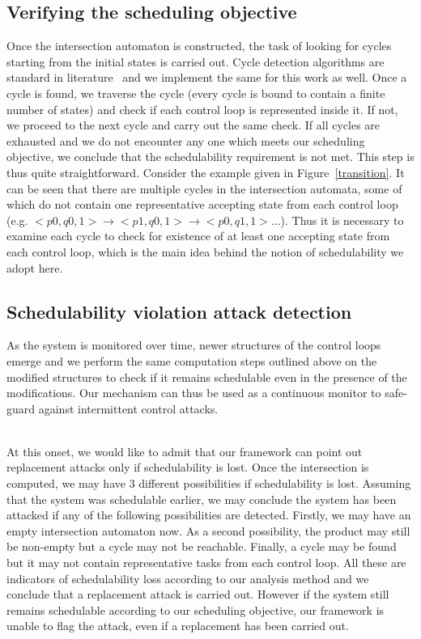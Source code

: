 \subsection{Verifying the scheduling objective}
\noindent
Once the intersection automaton is constructed, the task of looking for cycles starting from the initial states is carried out. Cycle detection algorithms are standard in literature~\cite{Clarke:2000:MC:332656} and we implement the same for this work as well. Once a cycle is found, we traverse the cycle (every cycle is bound to contain a finite number of states) and check if each control loop is represented inside it. If not, we proceed to the next cycle and carry out the same check. If all cycles are exhausted and we do not encounter any one which meets our scheduling objective, we conclude that the schedulability requirement is not met. This step is thus quite straightforward. Consider the example given in Figure~\ref{transition}. It can be seen that there are multiple cycles in the intersection automata, some of which do not contain one representative accepting state from each control loop (e.g. $<p0,q0,1> \rightarrow <p1,q0,1> \rightarrow <p0,q1,1> \ldots$). Thus it is necessary to examine each cycle to check for existence of at least one accepting state from each control loop, which is the main idea behind the notion of schedulability we adopt here. 

\subsection{Schedulability violation attack detection}
\noindent
As the system is monitored over time, newer structures of the control loops emerge and we perform the same computation steps outlined above on the modified structures to check if it remains schedulable even in the presence of the modifications. Our mechanism can thus be used as a continuous monitor to safe-guard against intermittent control attacks. 

~\\
\noindent
At this onset, we would like to admit that our framework can point out replacement attacks only if schedulability is lost. Once the intersection is computed, we may have 3 different possibilities if schedulability is lost. Assuming that the system was schedulable earlier, we may conclude the system has been attacked if any of the following possibilities are detected. Firstly, we may have an empty intersection automaton now. As a second possibility, the product may still be non-empty but a cycle may not be reachable. Finally, a cycle may be found but it may not contain representative tasks from each control loop. All these are indicators of schedulability loss according to our analysis method and we conclude that a replacement attack is carried out. However if the system still remains schedulable according to our scheduling objective, our framework is unable to flag the attack, even if a replacement has been carried out.